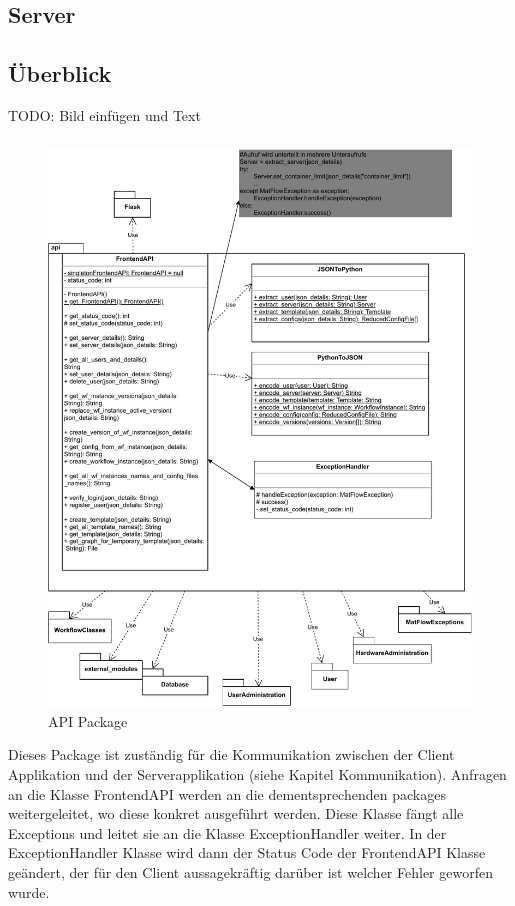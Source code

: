 \subsection{Server}

\subsection{Überblick}
TODO: Bild einfügen und Text

\subsubsection{}
\begin{figure}[H]
    \includegraphics[width=1\textwidth]{res/api.drawio.pdf}
    \caption{API Package}
\end{figure}
Dieses Package ist zuständig für die Kommunikation zwischen der Client Applikation und der Serverapplikation (siehe Kapitel 
Kommunikation). Anfragen an die Klasse FrontendAPI werden an die dementsprechenden packages weitergeleitet, wo diese konkret 
ausgeführt werden. Diese Klasse fängt alle Exceptions und leitet sie an die Klasse ExceptionHandler weiter.
In der ExceptionHandler Klasse wird dann der Status Code der FrontendAPI Klasse geändert, der für den Client aussagekräftig
darüber ist welcher Fehler geworfen wurde.


